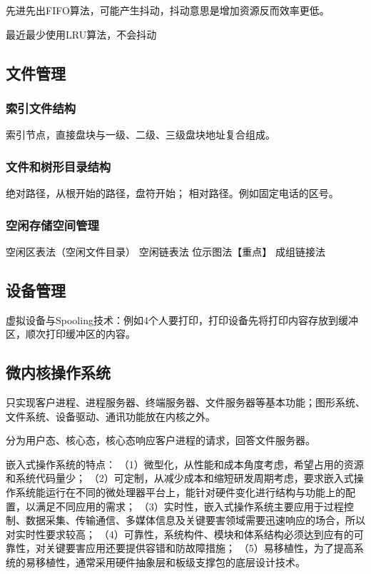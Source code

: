 \documentclass[UTF8]{article}
\begin{document}
先进先出FIFO算法，可能产生抖动，抖动意思是增加资源反而效率更低。

最近最少使用LRU算法，不会抖动



\subsection{文件管理}
\subsubsection{索引文件结构}

索引节点，直接盘块与一级、二级、三级盘块地址复合组成。

\subsubsection{文件和树形目录结构}
绝对路径，从根开始的路径，盘符开始；
相对路径。例如固定电话的区号。

\subsubsection{空闲存储空间管理}

空闲区表法（空闲文件目录）
空闲链表法
位示图法【重点】
成组链接法


\subsection{设备管理}
虚拟设备与Spooling技术：例如4个人要打印，打印设备先将打印内容存放到缓冲区，顺次打印缓冲区的内容。


\subsection{微内核操作系统}
只实现客户进程、进程服务器、终端服务器、文件服务器等基本功能；图形系统、文件系统、设备驱动、通讯功能放在内核之外。

分为用户态、核心态，核心态响应客户进程的请求，回答文件服务器。


嵌入式操作系统的特点：
（1）微型化，从性能和成本角度考虑，希望占用的资源和系统代码量少；
（2）可定制，从减少成本和缩短研发周期考虑，要求嵌入式操作系统能运行在不同的微处理器平台上，能针对硬件变化进行结构与功能上的配置，以满足不同应用的需求；
（3）实时性，嵌入式操作系统主要应用于过程控制、数据采集、传输通信、多媒体信息及关键要害领域需要迅速响应的场合，所以对实时性要求较高；
（4）可靠性，系统构件、模块和体系结构必须达到应有的可靠性，对关键要害应用还要提供容错和防故障措施；
（5）易移植性，为了提高系统的易移植性，通常采用硬件抽象层和板级支撑包的底层设计技术。 
\end{document}
